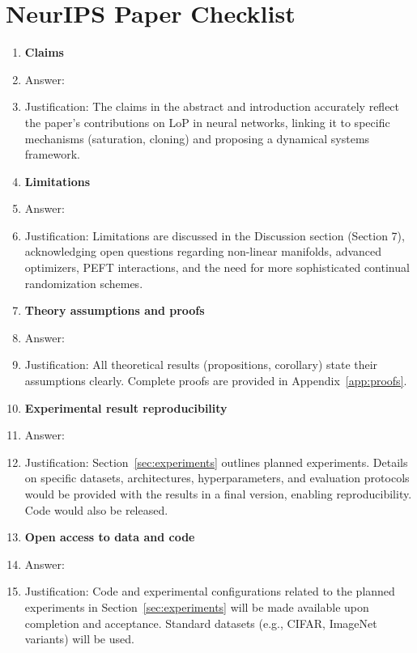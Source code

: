 \documentclass{article}
\begin{document}
\section*{NeurIPS Paper Checklist}
\begin{enumerate}
\item {\bf Claims}
    \item Answer: \answerYes{}
    \item Justification: The claims in the abstract and introduction accurately reflect the paper's contributions on LoP in neural networks, linking it to specific mechanisms (saturation, cloning) and proposing a dynamical systems framework.

\item {\bf Limitations}
    \item Answer: \answerYes{}
    \item Justification: Limitations are discussed in the Discussion section (Section 7), acknowledging open questions regarding non-linear manifolds, advanced optimizers, PEFT interactions, and the need for more sophisticated continual randomization schemes.

\item {\bf Theory assumptions and proofs}
    \item Answer: \answerYes{}
    \item Justification: All theoretical results (propositions, corollary) state their assumptions clearly. Complete proofs are provided in Appendix~\ref{app:proofs}.

\item {\bf Experimental result reproducibility}
    \item Answer: \answerNA{} %
    \item Justification: Section~\ref{sec:experiments} outlines planned experiments. Details on specific datasets, architectures, hyperparameters, and evaluation protocols would be provided with the results in a final version, enabling reproducibility. Code would also be released.

\item {\bf Open access to data and code}
    \item Answer: \answerNA{} %
    \item Justification: Code and experimental configurations related to the planned experiments in Section~\ref{sec:experiments} will be made available upon completion and acceptance. Standard datasets (e.g., CIFAR, ImageNet variants) will be used.


\end{enumerate}
\end{document}
